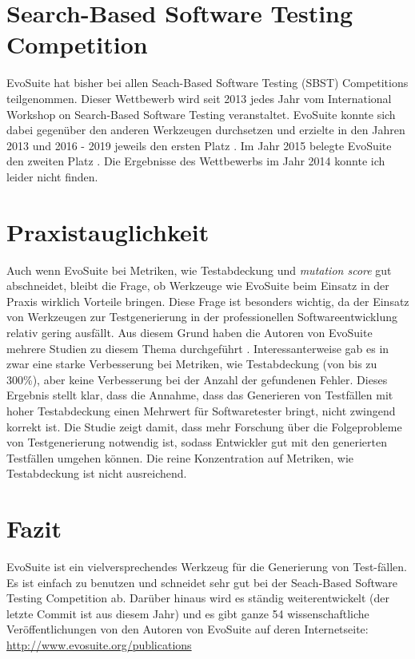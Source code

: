 \documentclass[a4paper,11pt]{article}
\begin{document}
\section{Search-Based Software Testing Competition}

EvoSuite hat bisher bei allen Seach-Based Software Testing (SBST) Competitions teilgenommen.
Dieser Wettbewerb wird seit 2013 jedes Jahr vom International Workshop on Search-Based Software Testing veranstaltet.
EvoSuite konnte sich dabei gegenüber den anderen Werkzeugen durchsetzen und erzielte in den Jahren 2013 und 2016 - 2019 jeweils den ersten Platz \cite{6571663, 7810701, 7967958, 8452806, 8812209}.
Im Jahr 2015 belegte EvoSuite den zweiten Platz \cite{7173585}.
Die Ergebnisse des Wettbewerbs im Jahr 2014 konnte ich leider nicht finden.

\section{Praxistauglichkeit}

Auch wenn EvoSuite bei Metriken, wie Testabdeckung und \textit{mutation score} gut abschneidet, bleibt die Frage, ob Werkzeuge wie EvoSuite beim Einsatz in der Praxis wirklich Vorteile bringen.
Diese Frage ist besonders wichtig, da der Einsatz von Werkzeugen zur Testgenerierung in der professionellen Softwareentwicklung relativ gering ausfällt.
Aus diesem Grund haben die Autoren von EvoSuite mehrere Studien zu diesem Thema durchgeführt \cite{ISSTA13_Study, ISSTA15_Study, TOSEM_userstudy}.
Interessanterweise gab es in \cite{TOSEM_userstudy} zwar eine starke Verbesserung bei Metriken, wie Testabdeckung (von bis zu 300\%), aber keine Verbesserung bei der Anzahl der gefundenen Fehler.
Dieses Ergebnis stellt klar, dass die Annahme, dass das Generieren von Testfällen mit hoher Testabdeckung einen Mehrwert für Softwaretester bringt, nicht zwingend korrekt ist.
Die Studie zeigt damit, dass mehr Forschung über die Folgeprobleme von Testgenerierung notwendig ist, sodass Entwickler gut mit den generierten Testfällen umgehen können.
Die reine Konzentration auf Metriken, wie Testabdeckung ist nicht ausreichend.

\section{Fazit}

EvoSuite ist ein vielversprechendes Werkzeug für die Generierung von Test-fällen.
Es ist einfach zu benutzen und schneidet sehr gut bei der Seach-Based Software Testing Competition ab.
Darüber hinaus wird es ständig weiterentwickelt (der letzte Commit ist aus diesem Jahr) und es gibt ganze 54 wissenschaftliche Veröffentlichungen von den Autoren von EvoSuite auf deren Internetseite: \url{http://www.evosuite.org/publications}




\end{document}
